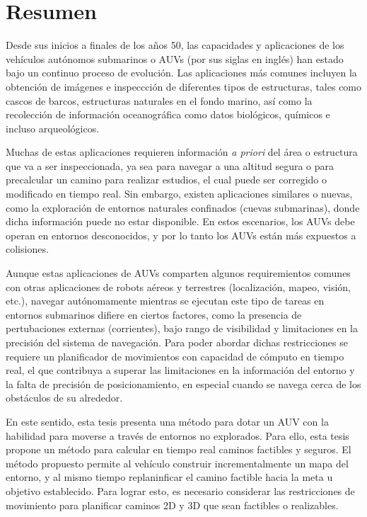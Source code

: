 \begingroup
\let\clearpage\relax
\let\cleardoublepage\relax
\let\cleardoublepage\relax

\chapter*{Resumen}

Desde sus inicios a finales de los años 50, las capacidades y aplicaciones de
los vehículos autónomos submarinos o AUVs (por sus siglas en inglés) han estado
bajo un continuo proceso de evolución. Las aplicaciones más comunes incluyen la
obtención de imágenes e inspeccción de diferentes tipos de estructuras, tales
como cascos de barcos, estructuras naturales en el fondo marino, así como la
recolección de información oceanográfica como datos biológicos, químicos e
incluso arqueológicos.

Muchas de estas aplicaciones requieren información \textit{a priori} del área o
estructura que va a ser inspeccionada, ya sea para navegar a una altitud segura
o para precalcular un camino para realizar estudios, el cual puede ser corregido
o modificado en tiempo real. Sin embargo, existen aplicaciones similares o nuevas,
como la exploración de entornos naturales confinados (\eg cuevas submarinas),
donde dicha información puede no estar disponible. En estos escenarios, los AUVs
debe operan en entornos desconocidos, y por lo tanto los AUVs están más
expuestos a colisiones.

Aunque estas aplicaciones de AUVs comparten algunos requiremientos comunes con
otras aplicaciones de robots aéreos y terrestres (\eg localización, mapeo,
visión, etc.), navegar autónomamente mientras se ejecutan este tipo de tareas en
entornos submarinos difiere en ciertos factores, como la presencia de
pertubaciones externas (corrientes), bajo rango de visibilidad y limitaciones en
la precisión del sistema de navegación. Para poder abordar dichas restricciones
se requiere un planificador de movimientos con capacidad de cómputo en tiempo
real, el que contribuya a superar las limitaciones en la información del entorno
y la falta de precisión de posicionamiento, en especial cuando se navega cerca
de los obstáculos de su alrededor.

En este sentido, esta tesis presenta una método para dotar un AUV con la
habilidad para moverse a través de entornos no explorados. Para ello, esta tesis
propone un método para calcular en tiempo real caminos factibles y seguros. El
método propuesto permite al vehículo construir incrementalmente un mapa del
entorno, y al mismo tiempo replaninficar el camino factible hacia la meta u
objetivo establecido. Para lograr esto, es necesario considerar las
restricciones de movimiento para planificar caminos 2D y 3D que sean factibles o
realizables.

